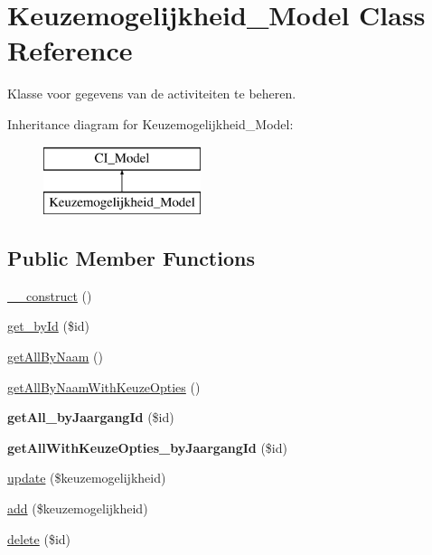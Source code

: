 \hypertarget{class_keuzemogelijkheid___model}{}\section{Keuzemogelijkheid\+\_\+\+Model Class Reference}
\label{class_keuzemogelijkheid___model}


Klasse voor gegevens van de activiteiten te beheren.  


Inheritance diagram for Keuzemogelijkheid\+\_\+\+Model\+:\begin{figure}[H]
\begin{center}
\leavevmode
\includegraphics[height=2.000000cm]{class_keuzemogelijkheid___model}
\end{center}
\end{figure}
\subsection*{Public Member Functions}
\begin{DoxyCompactItemize}
\item 
\mbox{\hyperlink{class_keuzemogelijkheid___model_af2af463bdcd6443ce1a30dade7d100c2}{\+\_\+\+\_\+construct}} ()
\item 
\mbox{\hyperlink{class_keuzemogelijkheid___model_a88c8b0a6b02a7da7c5d1d573a66c11c7}{get\+\_\+by\+Id}} (\$id)
\item 
\mbox{\hyperlink{class_keuzemogelijkheid___model_a0dd8e66ae398c5e3ab1c39b62d24cf21}{get\+All\+By\+Naam}} ()
\item 
\mbox{\hyperlink{class_keuzemogelijkheid___model_aa91aa36f90acdb972b5ba59935d1f499}{get\+All\+By\+Naam\+With\+Keuze\+Opties}} ()
\item 
\mbox{\label{class_keuzemogelijkheid___model_a384efcd56387e3852dc75a5f1d4f5b9e}} 
{\bfseries get\+All\+\_\+by\+Jaargang\+Id} (\$id)
\item 
\mbox{\label{class_keuzemogelijkheid___model_a2351480e07cbf850f42aadc20959668a}} 
{\bfseries get\+All\+With\+Keuze\+Opties\+\_\+by\+Jaargang\+Id} (\$id)
\item 
\mbox{\hyperlink{class_keuzemogelijkheid___model_ab075f39b3a3ea0b4ee501c57ee9ca56c}{update}} (\$keuzemogelijkheid)
\item 
\mbox{\hyperlink{class_keuzemogelijkheid___model_a420eeb2819baee7810c6f75adc37bccd}{add}} (\$keuzemogelijkheid)
\item 
\mbox{\hyperlink{class_keuzemogelijkheid___model_a85892ff217264f748b19a7da2797a9c7}{delete}} (\$id)
\end{DoxyCompactItemize}


